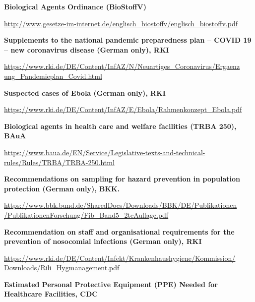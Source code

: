 \documentclass{article}
\begin{document}
\textbf{Biological Agents Ordinance (BioStoffV) }


\href{http://www.gesetze-im-internet.de/englisch_biostoffv/englisch_biostoffv.pdf}{http://www.gesetze-im-internet.de/englisch\_biostoffv/englisch\_biostoffv.pdf}


\textbf{Supplements to the national pandemic preparedness plan – COVID 19 – new coronavirus disease (German only), RKI}


\href{https://www.rki.de/DE/Content/InfAZ/N/Neuartiges_Coronavirus/Ergaenzung_Pandemieplan_Covid.html}{https://www.rki.de/DE/Content/InfAZ/N/Neuartiges\_Coronavirus/Ergaenz} \href{https://www.rki.de/DE/Content/InfAZ/N/Neuartiges_Coronavirus/Ergaenzung_Pandemieplan_Covid.html}{ung\_Pandemieplan\_Covid.html}


\textbf{Suspected cases of Ebola (German only), RKI}


\href{https://www.rki.de/DE/Content/InfAZ/E/Ebola/Rahmenkonzept_Ebola.pdf}{https://www.rki.de/DE/Content/InfAZ/E/Ebola/Rahmenkonzept\_Ebola.pdf}


\textbf{Biological agents in health care and welfare facilities (TRBA 250), BAuA}


\href{https://www.baua.de/EN/Service/Legislative-texts-and-technical-rules/Rules/TRBA/TRBA-250.html}{https://www.baua.de/EN/Service/Legislative-texts-and-technical-rules/Rules/TRBA/TRBA-250.html} 


\textbf{Recommendations on sampling for hazard prevention in population protection (German only), BKK.}


\href{https://www.bbk.bund.de/SharedDocs/Downloads/BBK/DE/Publikationen/PublikationenForschung/Fib_Band5_2teAuflage.pdf?__blob=publicationFile}{https://www.bbk.bund.de/SharedDocs/Downloads/BBK/DE/Publikationen} \href{https://www.bbk.bund.de/SharedDocs/Downloads/BBK/DE/Publikationen/PublikationenForschung/Fib_Band5_2teAuflage.pdf?__blob=publicationFile}{/PublikationenForschung/Fib\_Band5\_2teAuflage.pdf}


\textbf{Recommendation on staff and organisational requirements for the prevention of nosocomial infections (German only), RKI} 


\href{https://www.rki.de/DE/Content/Infekt/Krankenhaushygiene/Kommission/Downloads/Rili_Hygmanagement.pdf}{https://www.rki.de/DE/Content/Infekt/Krankenhaushygiene/Kommission/} \href{https://www.rki.de/DE/Content/Infekt/Krankenhaushygiene/Kommission/Downloads/Rili_Hygmanagement.pdf}{Downloads/Rili\_Hygmanagement.pdf}


\textbf{Estimated Personal Protective Equipment (PPE) Needed for Healthcare Facilities, CDC }
\end{document}
